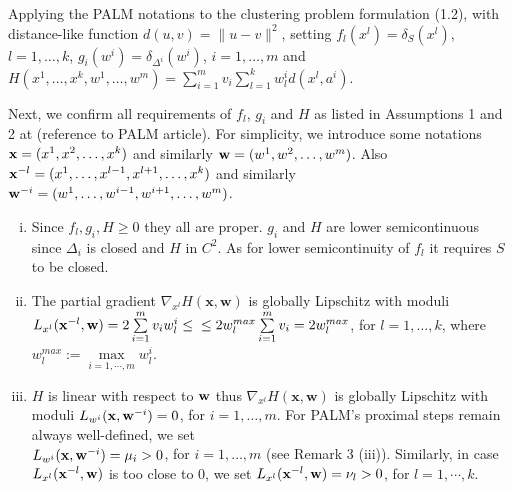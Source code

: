 \documentclass[11pt]{article}
\numberwithin{equation}{section}
\begin{document}
Applying the PALM notations to the clustering problem formulation (1.2), with distance-like function $d(u,v)= \| u-v \|^2$, setting $f_l(x^l)= \delta_S(x^l)$, $l=1, \dots ,k $, $g_i(w^i)= \delta_{\Delta^i}(w^i)$, $i=1, \dots ,m$ and $H(x^1, \dots ,x^k,w^1, \dots ,w^m)= \sum\limits_{i=1}^{m} v_i \sum\limits_{l=1}^{k} w^i_l d(x^l , a^i)$.

Next, we confirm all requirements of $f_l$, $g_i$ and $H$ as listed in Assumptions 1 and 2 at (reference to PALM article). For simplicity, we introduce some notations ${\bf x} = (x^1, x^{2} , \ldots ,x^{k})$ and similarly ${\bf w} = (w^1, w^{2} , \ldots ,w^{m})$. Also ${\bf x}^{-l} = (x^1, \ldots ,x^{l-1}, x^{l+1}, \ldots ,x^{k})$ and similarly \\ ${\bf w}^{-i} = (w^1, \ldots ,w^{i-1}, w^{i+1}, \ldots ,w^{m})$.
\begin{enumerate}[(i)]
  \item Since $f_l,g_i,H \geq 0$ they all are proper. $g_i$ and $H$ are lower semicontinuous since $\Delta_i$ is closed and $H$ in $C^2$. As for lower semicontinuity of $f_l$ it requires $S$ to be closed.
  \item The partial gradient $\nabla_{x^l}H(\textbf{x}, \textbf{w})$ is globally Lipschitz with moduli $L_{x^l}({\bf x}^{-l}, {\bf w})=2\sum\limits_{i=1}^{m} v_i w_l^i \leq \\ \leq 2w_{l}^{max}\sum\limits_{i=1}^{m} v_i = 2w_{l}^{max}$, for $l=1, \dots ,k$, where $w^{max}_l:=\max\limits_{i=1, \cdots ,m} w^i_l$.
  \item $H$ is linear with respect to ${\bf w}$ thus $\nabla_{x^l}H(\textbf{x}, \textbf{w})$ is globally Lipschitz with moduli $L_{w^i}({\bf x}, {\bf w}^{-i})=0$, for $i=1, \dots ,m$. For PALM's proximal steps remain always well-defined, we set \\ $L_{w^i}({\bf x}, {\bf w}^{-i})= \mu_i > 0$, for $i=1, \dots ,m$ (see Remark 3 (iii)). Similarly, in case $L_{x^l}({\bf x}^{-l}, {\bf w})$ is too close to $0$, we set $L_{x^l}({\bf x}^{-l}, {\bf w}) = \nu_l >0$, for $l=1, \cdots ,k$.

\end{enumerate}
\end{document}
